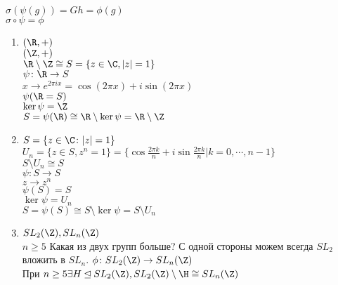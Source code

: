 \begin{Rem}
$\sigma(\psi(g)) = Gh = \phi(g)$ \\
$\sigma \circ \psi = \phi$\\
\end{Rem}
\begin{exmp}\hfill
\begin{enumerate}
\item
$(\R, +)$\\
$(\Z, +)$\\
$\R \setminus \Z \cong S = \{z \in \C, |z| = 1\}$ \\
$\psi\colon \R \to S$\\
$x \to e^{2\pi i x} = \cos(2\pi x) + i \sin(2\pi x)$\\
$\psi(\R = S)$\\
$\ker \psi = \Z$\\
$S = \psi(\R) \cong \R \setminus \ker \psi = \R \setminus \Z$\\
\item
$S = \{z \in \C \colon |z| = 1\}$\\
$U_n = \{z \in S, z^n = 1\} = \{\cos \frac{2\pi k}{n} + i \sin\frac{2\pi k}{n}| k = 0, \cdots, n - 1\}$\\
$S \setminus U_n \cong S$\\
$\psi\colon S \to S$\\
$z \to z^{n}$\\
$\psi(S) = S$\\
$\ker \psi = U_n$\\
$S = \psi(S) \cong S \setminus \ker \psi = S \setminus U_n$\\
\item
$SL_2(\Z), SL_n(\Z)$\\
$n \ge 5$
Какая из двух групп больше? 
С одной стороны можем всегда $SL_2$ вложить в $SL_n$.
$\phi \colon SL_2(\Z) \to SL_n(\Z)$\\
При $n \ge 5 \exists H \unlhd SL_2(\Z), SL_2(\Z) \setminus \H \cong SL_n(\Z)$
\end{enumerate}
\end{exmp}